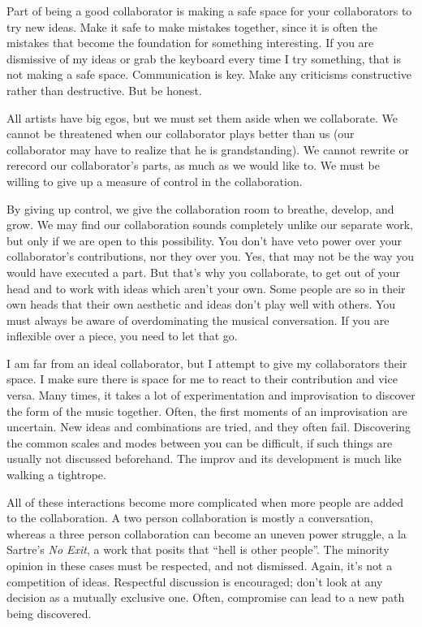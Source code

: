 \documentclass[
]{book}
\begin{document}
Part of being a good collaborator is making a safe space for your collaborators to try new ideas. Make it safe to make mistakes together, since it is often the mistakes that become the foundation for something interesting. If you are dismissive of my ideas or grab the keyboard every time I try something, that is not making a safe space. Communication is key. Make any criticisms constructive rather than destructive. But be honest.

All artists have big egos, but we must set them aside when we collaborate. We cannot be threatened when our collaborator plays better than us (our collaborator may have to realize that he is grandstanding). We cannot rewrite or rerecord our collaborator's parts, as much as we would like to. We must be willing to give up a measure of control in the collaboration.

By giving up control, we give the collaboration room to breathe, develop, and grow. We may find our collaboration sounds completely unlike our separate work, but only if we are open to this possibility. You don't have veto power over your collaborator's contributions, nor they over you. Yes, that may not be the way you would have executed a part. But that's why you collaborate, to get out of your head and to work with ideas which aren't your own. Some people are so in their own heads that their own aesthetic and ideas don't play well with others. You must always be aware of overdominating the musical conversation. If you are inflexible over a piece, you need to let that go.

I am far from an ideal collaborator, but I attempt to give my collaborators their space. I make sure there is space for me to react to their contribution and vice versa. Many times, it takes a lot of experimentation and improvisation to discover the form of the music together. Often, the first moments of an improvisation are uncertain. New ideas and combinations are tried, and they often fail. Discovering the common scales and modes between you can be difficult, if such things are usually not discussed beforehand. The improv and its development is much like walking a tightrope.

All of these interactions become more complicated when more people are added to the collaboration. A two person collaboration is mostly a conversation, whereas a three person collaboration can become an uneven power struggle, a la Sartre's \emph{No Exit}, a work that posits that ``hell is other people''. The minority opinion in these cases must be respected, and not dismissed. Again, it's not a competition of ideas. Respectful discussion is encouraged; don't look at any decision as a mutually exclusive one. Often, compromise can lead to a new path being discovered.
\end{document}
